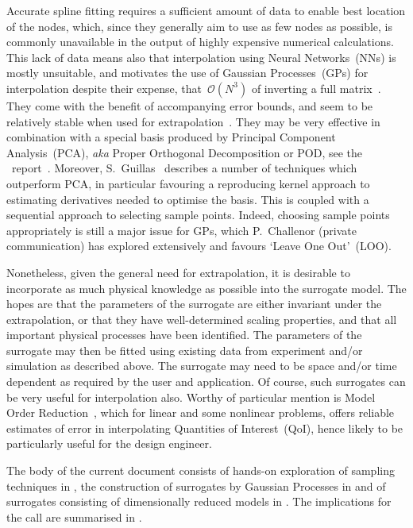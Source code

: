 Accurate spline fitting requires a sufficient amount of data to enable best location of the
nodes, which, since they generally aim to use as few nodes as possible, is commonly unavailable
in the output of
highly expensive numerical calculations. This lack of data means also that interpolation using
Neural Networks~(NNs)  is mostly unsuitable, and motivates the use of Gaussian Processes~(GPs)
for interpolation despite their expense, that~$\mathcal{O}(N^3)$ of inverting a full matrix~\cite{y2re242}.
They come with the benefit of accompanying error bounds, and seem to be relatively stable when
used for extrapolation~\cite{Ch20priv}. They may be very effective in combination with a 
special basis produced by Principal Component Analysis~(PCA), \emph{aka} Proper Orthogonal Decomposition
or POD, see the \nep\ report~\cite{2047352_2-TN-01}. Moreover, S.~Guillas~\cite{Li17Dime} describes
a number of techniques which outperform PCA, in particular favouring a reproducing kernel
approach to estimating derivatives needed to optimise the basis. This is coupled with
a sequential approach to selecting sample points.
Indeed, choosing sample points appropriately is still a major issue for GPs, which P.~Challenor (private
communication) has explored extensively and favours `Leave One Out'~(LOO).

Nonetheless, given the general need for extrapolation, it is desirable to incorporate as much
physical knowledge as possible into the surrogate model. The hopes are that the parameters
of the surrogate are either invariant under the extrapolation, or that they have well-determined
scaling properties, and that all important physical processes have been identified.
The parameters of the surrogate may then be fitted using existing data from
experiment and/or simulation as described above.
The surrogate may need to be space and/or time dependent as required by the
user and application. Of course, such surrogates can be very useful for interpolation also.
Worthy of particular mention is Model Order Reduction~\cite{y2re251}, which for linear and some nonlinear
problems, offers reliable estimates of error in interpolating Quantities of Interest~(QoI),
hence likely to be particularly useful for the design engineer.

The body of the current document consists of hands-on exploration of sampling techniques
in , the construction of surrogates by Gaussian Processes in  and
of surrogates consisting of dimensionally reduced models in .
The implications for the call are summarised in .

